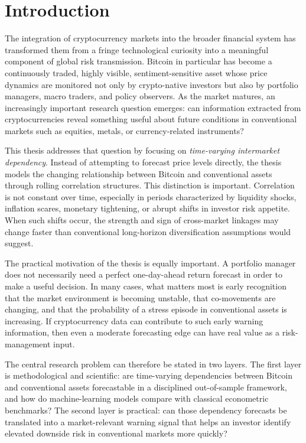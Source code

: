 ﻿\section{Introduction}

The integration of cryptocurrency markets into the broader financial system has transformed them from a fringe technological curiosity into a meaningful component of global risk transmission. Bitcoin in particular has become a continuously traded, highly visible, sentiment-sensitive asset whose price dynamics are monitored not only by crypto-native investors but also by portfolio managers, macro traders, and policy observers. As the market matures, an increasingly important research question emerges: can information extracted from cryptocurrencies reveal something useful about future conditions in conventional markets such as equities, metals, or currency-related instruments?

This thesis addresses that question by focusing on \emph{time-varying intermarket dependency}. Instead of attempting to forecast price levels directly, the thesis models the changing relationship between Bitcoin and conventional assets through rolling correlation structures. This distinction is important. Correlation is not constant over time, especially in periods characterized by liquidity shocks, inflation scares, monetary tightening, or abrupt shifts in investor risk appetite. When such shifts occur, the strength and sign of cross-market linkages may change faster than conventional long-horizon diversification assumptions would suggest.

The practical motivation of the thesis is equally important. A portfolio manager does not necessarily need a perfect one-day-ahead return forecast in order to make a useful decision. In many cases, what matters most is early recognition that the market environment is becoming unstable, that co-movements are changing, and that the probability of a stress episode in conventional assets is increasing. If cryptocurrency data can contribute to such early warning information, then even a moderate forecasting edge can have real value as a risk-management input.

The central research problem can therefore be stated in two layers. The first layer is methodological and scientific: are time-varying dependencies between Bitcoin and conventional assets forecastable in a disciplined out-of-sample framework, and how do machine-learning models compare with classical econometric benchmarks? The second layer is practical: can those dependency forecasts be translated into a market-relevant warning signal that helps an investor identify elevated downside risk in conventional markets more quickly?

